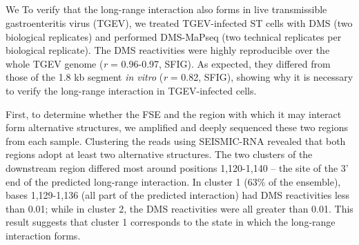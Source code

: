 \documentclass[main.tex]{subfiles}
\begin{document}
\subsection{}

We 
To verify that the long-range interaction also forms in live transmissible gastroenteritis virus (TGEV), we treated TGEV-infected ST cells with DMS (two biological replicates) and performed DMS-MaPseq (two technical replicates per biological replicate).
The DMS reactivities were highly reproducible over the whole TGEV genome (\textit{r} = 0.96-0.97, SFIG).
As expected, they differed from those of the 1.8 kb segment \textit{in vitro} (\textit{r} = 0.82, SFIG), showing why it is necessary to verify the long-range interaction in TGEV-infected cells.

First, to determine whether the FSE and the region with which it may interact form alternative structures, we amplified and deeply sequenced these two regions from each sample.
Clustering the reads using SEISMIC-RNA revealed that both regions adopt at least two alternative structures.
The two clusters of the downstream region differed most around positions 1,120-1,140 -- the site of the 3' end of the predicted long-range interaction.
In cluster 1 (63\% of the ensemble), bases 1,129-1,136 (all part of the predicted interaction) had DMS reactivities less than 0.01; while in cluster 2, the DMS reactivities were all greater than 0.01.
This result suggests that cluster 1 corresponds to the state in which the long-range interaction forms.
\end{document}
